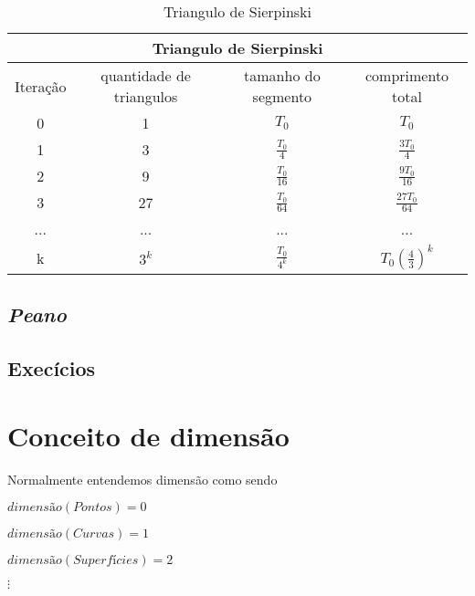 \documentclass[12pt]{report}
\theoremstyle{definition}
\begin{document}
{\renewcommand{\arraystretch}{1.5}
\begin{table}[h]

    \centering
        \begin{tabular}{| c | c | c | c |}
             \multicolumn{4}{c}{Triangulo de Sierpinski} \\
             \hline
             Iteração & quantidade de triangulos & tamanho do segmento & comprimento total\\
             \hline
             0 & 1 & $ T_0 $ & $ T_0 $ \\
             \hline
             1 & 3 & $ \frac{ T_0 }{4} $ & $\frac{ 3T_{0} }{4}$ \\
             \hline
             2 & 9 & $ \frac{ T_{0} }{16} $ & $\frac{ 9T_0}{16}$ \\
             \hline 
             3 & 27 & $ \frac{ T_{0} }{64} $ & $\frac{ 27T_0}{64}$ \\
             \hline
             ... & ... & ... & ... \\
             \hline
             k & $3^k$ & $ \frac{ T_{0} }{4^k} $ & $ T_0(\frac{4}{3})^k $ \\
             \hline
        \end{tabular}
    \caption{Triangulo de Sierpinski}
    \label{tab:msier}
\end{table}}


\section{\textit{Peano}}

\section{Execícios}

\chapter{Conceito de dimensão}

Normalmente entendemos dimensão como sendo 

\begin{center}
    \item \( dimensão(Pontos) = 0 \)
    \item \( dimensão(Curvas) = 1 \)
    \item \( dimensão(Superfícies) = 2 \)
    \item \(\vdots \)
\end{center}    
\end{document}
